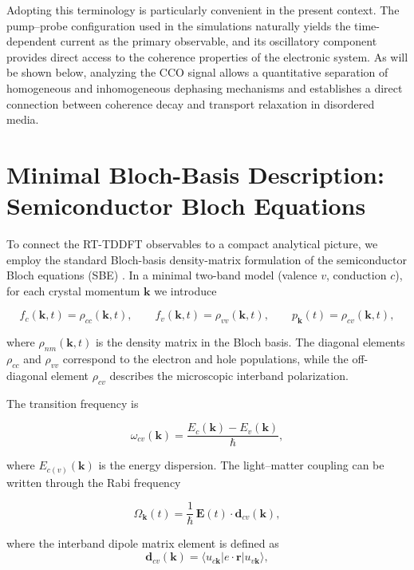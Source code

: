Adopting this terminology is particularly convenient in the present context. The pump–probe configuration used in the simulations naturally yields the time-dependent current as the primary observable, and its oscillatory component provides direct access to the coherence properties of the electronic system. As will be shown below, analyzing the CCO signal allows a quantitative separation of homogeneous and inhomogeneous dephasing mechanisms and establishes a direct connection between coherence decay and transport relaxation in disordered media.


\section{Minimal Bloch-Basis Description: Semiconductor Bloch Equations}

To connect the RT-TDDFT observables to a compact analytical picture, we employ the standard Bloch-basis density-matrix formulation of the semiconductor Bloch equations (SBE) \cite{HaugKoch2009,RossiKuhn2002}. In a minimal two-band model (valence $v$, conduction $c$), for each crystal momentum $\mathbf{k}$ we introduce

\begin{equation}
f_c(\mathbf{k},t)=\rho_{cc}(\mathbf{k},t), \qquad
f_v(\mathbf{k},t)=\rho_{vv}(\mathbf{k},t), \qquad
p_{\mathbf{k}}(t)=\rho_{cv}(\mathbf{k},t),
\end{equation}

where $\rho_{nm}(\mathbf k,t)$ is the density matrix in the Bloch basis.
The diagonal elements $\rho_{cc}$ and $\rho_{vv}$ correspond to the electron
and hole populations, while the off-diagonal element $\rho_{cv}$ describes
the microscopic interband polarization.


The transition frequency is

\begin{equation}
\omega_{cv}(\mathbf{k})=\frac{E_c(\mathbf{k})-E_v(\mathbf{k})}{\hbar},
\end{equation}

where $E_{c(v)}(\mathbf{k})$ is the energy dispersion. The light–matter coupling can be written through the Rabi frequency

\begin{equation}
\Omega_{\mathbf{k}}(t)=\frac{1}{\hbar}\,\mathbf{E}(t)\cdot \mathbf{d}_{cv}(\mathbf{k}),
\end{equation}

where the interband dipole matrix element is defined as
\begin{equation}
\mathbf d_{cv}(\mathbf k)
=
\langle u_{c\mathbf k} | e \cdot \mathbf r | u_{v\mathbf k} \rangle,
\end{equation}

